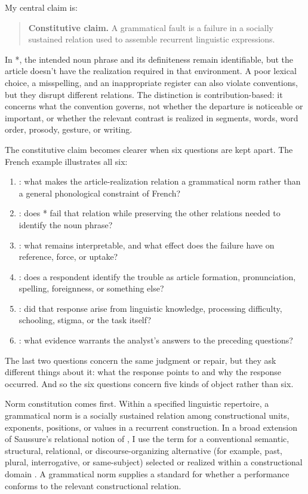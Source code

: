 \documentclass[12pt,letterpaper]{article}
\begin{document}
My central claim is:
\begin{quote}
\textbf{Constitutive claim.} A grammatical fault is a failure in a socially
sustained relation used to assemble recurrent linguistic expressions.
\end{quote}
In *,
the intended noun phrase and its definiteness remain identifiable, but the article
doesn't have the realization required in that environment. A poor lexical choice,
a misspelling, and an inappropriate register can also violate conventions, but
they disrupt different relations. The distinction is contribution-based: it
concerns what the convention governs, not whether the departure is noticeable or
important, or whether the relevant contrast is realized in segments, words, word
order, prosody, gesture, or writing.

The constitutive claim becomes clearer when six questions are kept apart. The
French example illustrates all six:
\begin{enumerate}[label=(\arabic*),leftmargin=*]
  \item {}: what makes the article-realization relation a
  grammatical norm rather than a general phonological constraint of French?
  \item {}: does * fail that relation while
  preserving the other relations needed to identify the noun phrase?
  \item {}: what remains interpretable, and
  what effect does the failure have on reference, force, or uptake?
  \item {}: does a respondent identify the trouble as
  article formation, pronunciation, spelling, foreignness, or something else?
  \item {}: did that response arise from linguistic
  knowledge, processing difficulty, schooling, stigma, or the task itself?
  \item {}: what evidence warrants the analyst's
  answers to the preceding questions?
\end{enumerate}
The last two questions concern the same judgment or repair, but they ask different
things about it: what the response points to and why the response occurred. And so
the six questions concern five kinds of object rather than six.

Norm constitution comes first. Within a specified linguistic repertoire, a
grammatical norm is a socially sustained relation among constructional units,
exponents, positions, or values in a recurrent construction. In a broad extension
of Saussure's relational
notion of , I use the term for a conventional semantic, structural,
relational, or discourse-organizing alternative (for example, past, plural,
interrogative, or same-subject) selected or realized within a constructional
domain \citep[Part~II, Ch.~IV]{saussure1916}. A grammatical norm supplies a standard
for whether a performance conforms to the relevant constructional relation.
\end{document}
